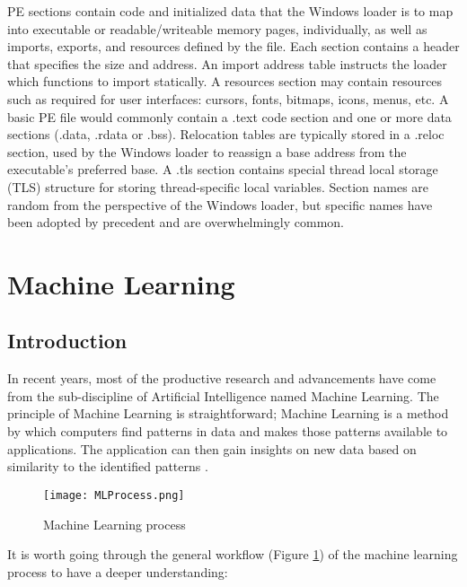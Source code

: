 PE sections contain code and initialized data that the Windows loader is to map into executable or readable/writeable memory pages, individually, as well as imports, exports, and resources defined by the file. Each section contains a header that specifies the size and address. An import address table instructs the loader which functions to import statically. A resources section may contain resources such as required for user interfaces: cursors, fonts, bitmaps, icons, menus, etc. A basic PE file would commonly contain a .text code section and one or more data sections (.data, .rdata or .bss). Relocation tables are typically stored in a .reloc section, used by the Windows loader to reassign a base address from the executable’s preferred base. A .tls section contains special thread local storage (TLS) structure for storing thread-specific local variables. Section names are random from the perspective of the Windows loader, but specific names have been adopted by precedent and are overwhelmingly common.

\section{Machine Learning}

\subsection{Introduction}
\label{ssec:machine-learning-intro}

In recent years, most of the productive research and advancements have come from the sub-discipline of Artificial Intelligence named Machine Learning. The principle of Machine Learning is straightforward; Machine Learning is a method by which computers find patterns in data and makes those patterns available to applications. The application can then gain insights on new data based on similarity to the identified patterns \cite{martin2016machine}.

\begin{figure}[htbp!] 
\centering    
\texttt{[image: MLProcess.png]}
\caption{Machine Learning process \cite{martin2016machine}}
\label{fig:ml-process}
\end{figure}

It is worth going through the general workflow (Figure \ref{fig:ml-process}) of the machine learning process to have a deeper understanding:

